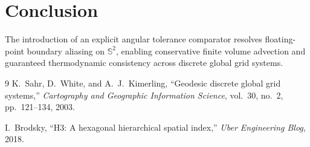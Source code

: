 \documentclass[10pt,twocolumn,letterpaper]{article}
\theoremstyle{definition}
\begin{document}
\section{Conclusion}
The introduction of an explicit angular tolerance comparator resolves floating-point boundary aliasing on $\mathbb{S}^2$, enabling conservative finite volume advection and guaranteed thermodynamic consistency across discrete global grid systems.

\begin{thebibliography}{9}
K.~Sahr, D.~White, and A.~J.~Kimerling,
``Geodesic discrete global grid systems,''
\emph{Cartography and Geographic Information Science}, vol.~30, no.~2, pp.~121--134, 2003.

I.~Brodsky,
``H3: A hexagonal hierarchical spatial index,''
\emph{Uber Engineering Blog}, 2018.
\end{thebibliography}
\end{document}
